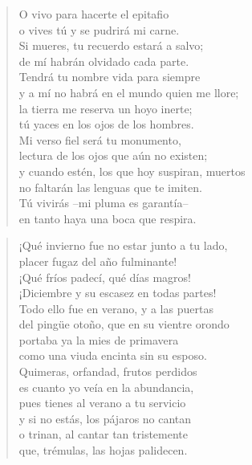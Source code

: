 \documentclass[12pt]{article}
\begin{document}
\clearpage
{}
\begin{verse}

O vivo para hacerte el epitafio\\
o vives tú y se pudrirá mi carne.\\
Si mueres, tu recuerdo estará a salvo;\\
de mí habrán olvidado cada parte.\\
Tendrá tu nombre vida para siempre\\
y a mí no habrá en el mundo quien me llore;\\
la tierra me reserva un hoyo inerte;\\
tú yaces en los ojos de los hombres.\\
Mi verso fiel será tu monumento,\\
lectura de los ojos que aún no existen;\\
y cuando estén, los que hoy suspiran, muertos\\
no faltarán las lenguas que te imiten.\\
Tú vivirás --mi pluma es garantía--\\
en tanto haya una boca que respira.

\end{verse}

\clearpage
{}
\begin{verse}

¡Qué invierno fue no estar junto a tu lado,\\
placer fugaz del año fulminante!\\
¡Qué fríos padecí, qué días magros!\\
¡Diciembre y su escasez en todas partes!\\
Todo ello fue en verano, y a las puertas\\
del pingüe otoño, que en su vientre orondo\\
portaba ya la mies de primavera\\
como una viuda encinta sin su esposo.\\
Quimeras, orfandad, frutos perdidos\\
es cuanto yo veía en la abundancia,\\
pues tienes al verano a tu servicio\\
y si no estás, los pájaros no cantan\\
o trinan, al cantar tan tristemente\\
que, trémulas, las hojas palidecen.

\end{verse}
\end{document}

